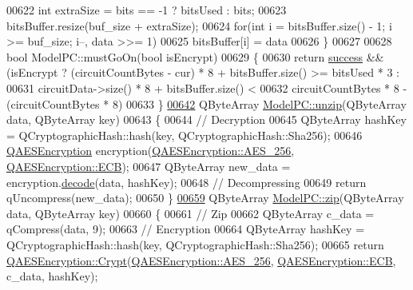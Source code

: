 \begin{DoxyCode}
{00622     \textcolor{keywordtype}{int} extraSize = bits == -1 ? bitsUsed : bits;
00623     bitsBuffer.resize(buf\_size + extraSize);
00624     \textcolor{keywordflow}{for}(\textcolor{keywordtype}{int} i = bitsBuffer.size() - 1; i >= buf\_size; i--, data >>= 1)
00625         bitsBuffer[i] = data %
00626 \}
00627 
00628 \textcolor{keywordtype}{bool} ModelPC::mustGoOn(\textcolor{keywordtype}{bool} isEncrypt)
00629 \{
00630     \textcolor{keywordflow}{return} \hyperlink{class_model_p_c_a945ffbbc44a832b953c191debd448f4c}{success} && (isEncrypt ? (circuitCountBytes - cur) * 8 + bitsBuffer.size() >= bitsUsed * 3
       :
00631                                    circuitData->size() * 8 + bitsBuffer.size() <
00632                                    circuitCountBytes * 8 - (circuitCountBytes * 8)%
00633 \}
\hypertarget{modelpc_8cpp_source_l00642}{}\hyperlink{class_model_p_c_a6da88f166785a49f73b22c169f956fd0}{00642} QByteArray \hyperlink{class_model_p_c_a6da88f166785a49f73b22c169f956fd0}{ModelPC::unzip}(QByteArray data, QByteArray key)
00643 \{
00644     \textcolor{comment}{// Decryption}
00645     QByteArray hashKey = QCryptographicHash::hash(key, QCryptographicHash::Sha256);
00646     \hyperlink{class_q_a_e_s_encryption}{QAESEncryption} encryption(\hyperlink{class_q_a_e_s_encryption_abe48208f4f6c7d68e6a10b49b9d0b7bdacde97774ab1d4c609e04b0dd13a1e1f7}{QAESEncryption::AES\_256}, 
      \hyperlink{class_q_a_e_s_encryption_ad3e031c49a3d56566379d75b40b7b255a4ca7f51778e2adf1f464164a0ba8e75e}{QAESEncryption::ECB});
00647     QByteArray new\_data = encryption.\hyperlink{class_q_a_e_s_encryption_a58f972f2b66c2454edd5112495463bba}{decode}(data, hashKey);
00648     \textcolor{comment}{// Decompressing}
00649     \textcolor{keywordflow}{return} qUncompress(new\_data);
00650 \}
\hypertarget{modelpc_8cpp_source_l00659}{}\hyperlink{class_model_p_c_afebbbfa4b07deba4f68fc6dfb50f353f}{00659} QByteArray \hyperlink{class_model_p_c_afebbbfa4b07deba4f68fc6dfb50f353f}{ModelPC::zip}(QByteArray data, QByteArray key)
00660 \{
00661     \textcolor{comment}{// Zip}
00662     QByteArray c\_data = qCompress(data, 9);
00663     \textcolor{comment}{// Encryption}
00664     QByteArray hashKey = QCryptographicHash::hash(key, QCryptographicHash::Sha256);
00665     \textcolor{keywordflow}{return} \hyperlink{class_q_a_e_s_encryption_a43819eeb6a7cb29fbd3cb6ad640dcbdf}{QAESEncryption::Crypt}(\hyperlink{class_q_a_e_s_encryption_abe48208f4f6c7d68e6a10b49b9d0b7bdacde97774ab1d4c609e04b0dd13a1e1f7}{QAESEncryption::AES\_256}, 
      \hyperlink{class_q_a_e_s_encryption_ad3e031c49a3d56566379d75b40b7b255a4ca7f51778e2adf1f464164a0ba8e75e}{QAESEncryption::ECB}, c\_data, hashKey);
}
\end{DoxyCode}
